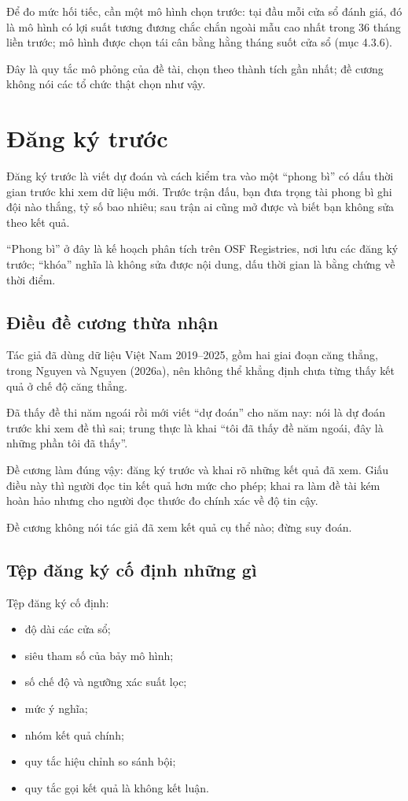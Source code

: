 Để đo mức hối tiếc, cần một mô hình chọn trước: tại đầu mỗi cửa sổ đánh giá, đó là mô hình có lợi suất tương đương chắc chắn ngoài mẫu cao nhất trong 36 tháng liền trước; mô hình được chọn tái cân bằng hằng tháng suốt cửa sổ (mục 4.3.6).

Đây là quy tắc mô phỏng của đề tài, chọn theo thành tích gần nhất; đề cương không nói các tổ chức thật chọn như vậy.

\section{Đăng ký trước}

Đăng ký trước là viết dự đoán và cách kiểm tra vào một “phong bì” có dấu thời gian trước khi xem dữ liệu mới. Trước trận đấu, bạn đưa trọng tài phong bì ghi đội nào thắng, tỷ số bao nhiêu; sau trận ai cũng mở được và biết bạn không sửa theo kết quả.

“Phong bì” ở đây là kế hoạch phân tích trên OSF Registries, nơi lưu các đăng ký trước; “khóa” nghĩa là không sửa được nội dung, dấu thời gian là bằng chứng về thời điểm.

\subsection{Điều đề cương thừa nhận}

Tác giả đã dùng dữ liệu Việt Nam 2019--2025, gồm hai giai đoạn căng thẳng, trong Nguyen và Nguyen (2026a), nên không thể khẳng định chưa từng thấy kết quả ở chế độ căng thẳng.

Đã thấy đề thi năm ngoái rồi mới viết “dự đoán” cho năm nay: nói là dự đoán trước khi xem đề thì sai; trung thực là khai “tôi đã thấy đề năm ngoái, đây là những phần tôi đã thấy”.

Đề cương làm đúng vậy: đăng ký trước và khai rõ những kết quả đã xem. Giấu điều này thì người đọc tin kết quả hơn mức cho phép; khai ra làm đề tài kém hoàn hảo nhưng cho người đọc thước đo chính xác về độ tin cậy.

Đề cương không nói tác giả đã xem kết quả cụ thể nào; đừng suy đoán.

\subsection{Tệp đăng ký cố định những gì}

Tệp đăng ký cố định:

\begin{itemize}
\item
  độ dài các cửa sổ;
\item
  siêu tham số của bảy mô hình;
\item
  số chế độ và ngưỡng xác suất lọc;
\item
  mức ý nghĩa;
\item
  nhóm kết quả chính;
\item
  quy tắc hiệu chỉnh so sánh bội;
\item
  quy tắc gọi kết quả là không kết luận.
\end{itemize}

